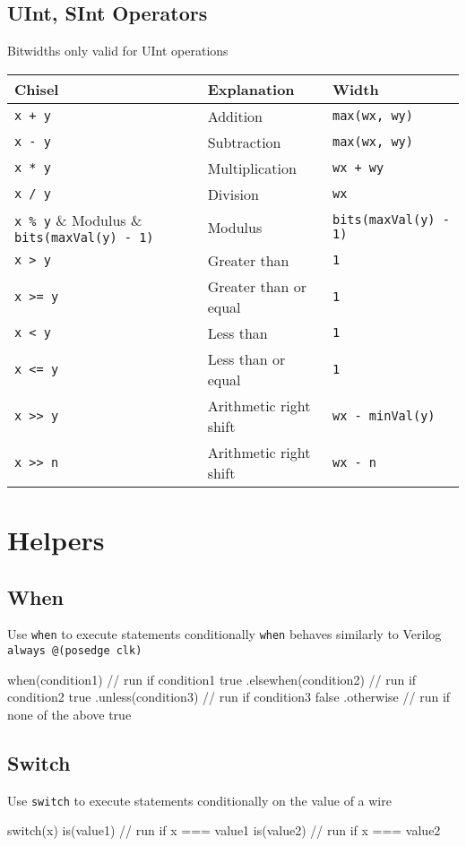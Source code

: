 \documentclass[10pt,landscape]{article}
\begin{document}
\begin{multicols}{3}
\subsection{UInt, SInt Operators}
Bitwidths only valid for UInt operations

\begin{tabular}{l l l}
Chisel & Explanation & Width \\
\hline
\hline
\verb$x + y$ & Addition & \verb$max(wx, wy)$ \\
\verb$x - y$ & Subtraction & \verb$max(wx, wy)$ \\
\verb$x * y$ & Multiplication & \verb$wx + wy$ \\
\verb$x / y$ & Division & \verb$wx$ \\
\verb$x % y$ & Modulus & \verb$bits(maxVal(y) - 1)$ \\
\hline
\verb$x > y$ & Greater than & \verb$1$ \\
\verb$x >= y$ & Greater than or equal & \verb$1$ \\
\verb$x < y$ & Less than & \verb$1$ \\
\verb$x <= y$ & Less than or equal & \verb$1$ \\
\hline
\verb$x >> y$ & Arithmetic right shift & \verb$wx - minVal(y)$ \\
\verb$x >> n$ & Arithmetic right shift & \verb$wx - n$ \\
\end{tabular}

\section{Helpers}
\subsection{When}
Use \verb$when$ to execute statements conditionally \newline
\verb$when$ behaves similarly to Verilog \newline \verb$always @(posedge clk)$
\begin{scala}
when(condition1) {
	// run if condition1 true
} .elsewhen(condition2) {
	// run if condition2 true
} .unless(condition3) {
	// run if condition3 false
} .otherwise {
	// run if none of the above true
}
\end{scala}

\subsection{Switch}
Use \verb$switch$ to execute statements conditionally \newline
on the value of a wire \newline
\begin{scala}
switch(x) {
	is(value1) {
		// run if x === value1
	} is(value2) {
		// run if x === value2
	}
}
\end{scala}


\end{multicols}
\end{document}
